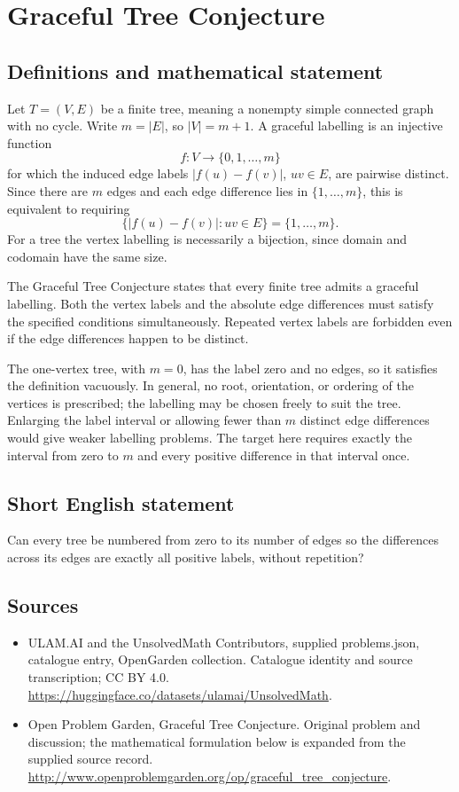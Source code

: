 \documentclass[11pt,a4paper]{article}
\begin{document}
\section*{Graceful Tree Conjecture}\label{statement}

\subsection{Definitions and mathematical statement}
Let $T=(V,E)$ be a finite tree, meaning
a nonempty simple connected graph with
no cycle. Write $m=|E|$, so $|V|=m+1$.
A graceful labelling is an injective
function
\[
 f:V\longrightarrow\{0,1,\ldots,m\}
\]
for which the induced edge labels
$|f(u)-f(v)|$, $uv\in E$, are pairwise
distinct. Since there are $m$ edges
and each edge difference lies in
$\{1,\ldots,m\}$, this is equivalent
to requiring
\[
 \{|f(u)-f(v)|:uv\in E\}=\{1,\ldots,m\}.
\]
For a tree the vertex labelling is
necessarily a bijection, since domain
and codomain have the same size.

The Graceful Tree Conjecture states
that every finite tree admits a
graceful labelling. Both the vertex
labels and the absolute edge differences
must satisfy the specified conditions
simultaneously. Repeated vertex labels
are forbidden even if the edge
differences happen to be distinct.

The one-vertex tree, with $m=0$,
has the label zero and no edges,
so it satisfies the definition
vacuously. In general, no root,
orientation, or ordering of the
vertices is prescribed; the labelling
may be chosen freely to suit the
tree. Enlarging the label interval
or allowing fewer than $m$ distinct
edge differences would give weaker
labelling problems. The target here
requires exactly the interval from
zero to $m$ and every positive
difference in that interval once.
\subsection{Short English statement}
Can every tree be numbered from zero to its number of edges so the differences across its edges are exactly all positive labels, without repetition?
\subsection{Sources}
\begin{itemize}
\item[S1] ULAM.AI and the UnsolvedMath Contributors, supplied problems.json, catalogue entry, OpenGarden collection. Catalogue identity and source transcription; CC BY 4.0.
\url{https://huggingface.co/datasets/ulamai/UnsolvedMath}.
\item[S2] Open Problem Garden, Graceful Tree Conjecture. Original problem and discussion; the mathematical formulation below is expanded from the supplied source record.
\url{http://www.openproblemgarden.org/op/graceful_tree_conjecture}.
\end{itemize}
\end{document}
